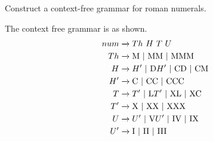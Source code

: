\begin{exercise}\label{ex:020206}
    Construct a context-free grammar for roman numerals.
\end{exercise}
\begin{solution}\label{sol:020206}
    The context free grammar is as shown.
    \begin{align*}
        num &\xrightarrow{} Th\ H\ T\ U \\
        Th &\xrightarrow{} \textrm{M | MM | MMM} \\
        H &\xrightarrow{} H'\ | \textrm{ D}H'\ \textrm{| CD | CM} \\
        H' &\xrightarrow{} \textrm{C | CC | CCC} \\
        T &\xrightarrow{} T'\ | \textrm{ L}T'\ \textrm{| XL | XC} \\
        T' &\xrightarrow{} \textrm{X | XX | XXX} \\
        U &\xrightarrow{} U'\ | \textrm{ V}U'\ \textrm{| IV | IX} \\
        U' &\xrightarrow{} \textrm{I | II | III}
    \end{align*}
\end{solution}